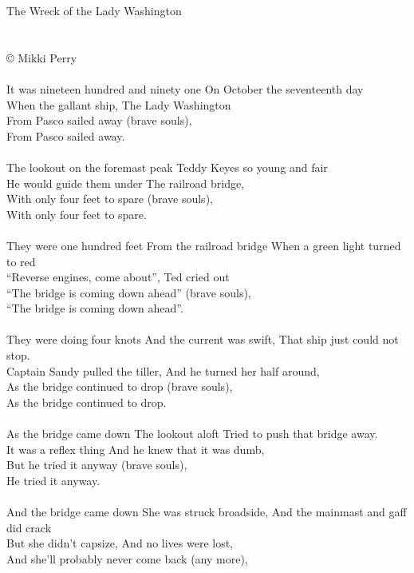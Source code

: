 \documentclass[letterpaper,9pt]{article}
\begin{document}
\newpage
{}
\huge
The Wreck of the Lady Washington\\
\\
\large
\noindent
\\© Mikki Perry
\\
\\It was nineteen hundred and ninety one On October the seventeenth day
\\When the gallant ship, The Lady Washington
\\From Pasco sailed away (brave souls),
\\From Pasco sailed away.
\\
\\The lookout on the foremast peak Teddy Keyes so young and fair
\\He would guide them under The railroad bridge,
\\With only four feet to spare (brave souls),
\\With only four feet to spare.
\\
\\They were one hundred feet From the railroad bridge When a green light turned to red
\\“Reverse engines, come about”, Ted cried out
\\“The bridge is coming down ahead” (brave souls),
\\“The bridge is coming down ahead”.
\\
\\They were doing four knots And the current was swift, That ship just could not stop. 
\\Captain Sandy pulled the tiller, And he turned her half around,
\\As the bridge continued to drop (brave souls),
\\As the bridge continued to drop.
\\
\\As the bridge came down The lookout aloft Tried to push that bridge away.
\\It was a reflex thing And he knew that it was dumb,
\\But he tried it anyway (brave souls),
\\He tried it anyway.
\\
\\And the bridge came down She was struck broadside, And the mainmast and gaff did crack
\\But she didn't capsize, And no lives were lost,
\\And she'll probably never come back (any more),
\end{document}
